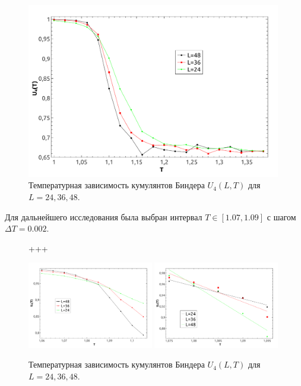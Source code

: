 \documentclass[a4paper,14pt]{extarticle}
\begin{document}
\begin{figure}[H]
	\begin{center}
		\includegraphics[width=0.99\textwidth]{kumfff.pdf}
		\caption{\label{testSolution} Температурная зависимость кумулянтов Биндера $U_4(L,T)$ для $L=24,36,48$.}
	\end{center}
\end{figure}

Для дальнейшего исследования была выбран интервал $T \in [1.07, 1.09]$ с шагом $\Delta T = 0.002$.
\begin{figure}[H]
	\begin{center}+++
		
		\includegraphics[width=0.49\textwidth]{kumsecond.pdf}
				\includegraphics[width=0.49\textwidth]{kumfirst.pdf}
		\caption{\label{testSolution} Температурная зависимость кумулянтов Биндера $U_4(L,T)$ для $L=24,36,48$.}
	\end{center}
\end{figure}
\end{document}
